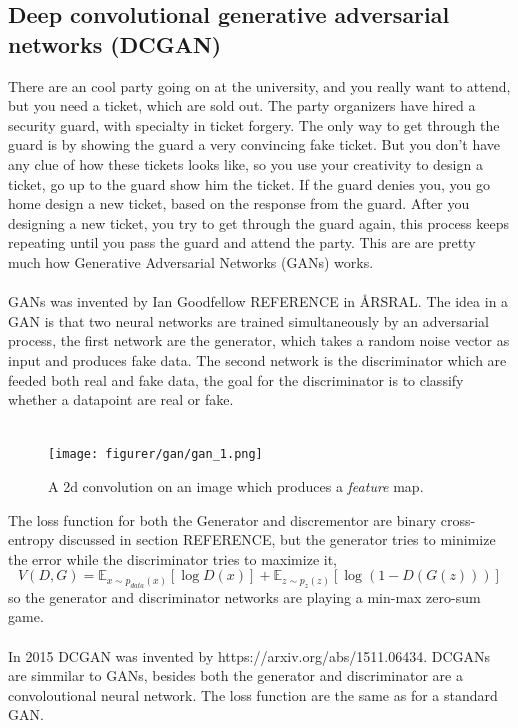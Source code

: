 \documentclass[11pt]{article}
\begin{document}
\subsection{Deep convolutional generative adversarial networks (DCGAN)}

There are an cool party going on at the university, and you really want to attend, but you need a ticket, which are sold out. The party organizers have hired a security guard, with specialty in ticket forgery. The only way to get through the guard is by showing the guard a very convincing fake ticket. But you don't have any clue of how these tickets looks like, so you use your creativity to design a ticket, go up to the guard show him the ticket. If the guard denies you, you go home design a new ticket, based on the response from the guard. After you designing a new ticket, you try to get through the guard again, this process keeps repeating until you pass the guard and attend the party. This are are pretty much how Generative Adversarial Networks (GANs) works.
\\ \\
GANs was invented by Ian Goodfellow REFERENCE in ÅRSRAL. The idea in a GAN is that two neural networks are trained simultaneously by an adversarial process, the first network are the generator, which takes a random noise vector as input and produces fake data. The second network is the discriminator which are feeded both real and fake data, the goal for the discriminator is to classify whether a datapoint are real or fake.
\\ \\
\begin{figure}[!h]
    \centering
    \texttt{[image: figurer/gan/gan\_1.png]}
    \caption{A 2d convolution on an image which produces a \textit{feature} map.}
    \label{fig:conv}
\end{figure}
The loss function for both the Generator and discrementor are binary cross-entropy discussed in section REFERENCE, but the generator tries to minimize the error while the discriminator tries to maximize it,
\begin{equation}
    V(D, G) = \mathds{E}_{x \sim p_{data}(x)} [\log D(x)] + \mathds{E}_{z \sim p_{z} (z)} [\log (1 - D(G(z)))]
\end{equation}
so the generator and discriminator networks are playing a min-max zero-sum game.
\\ \\
In 2015 DCGAN was invented by https://arxiv.org/abs/1511.06434. DCGANs are simmilar to GANs, besides both the generator and discriminator are a convoloutional neural network. The loss function are the same as for a standard GAN.
\end{document}
